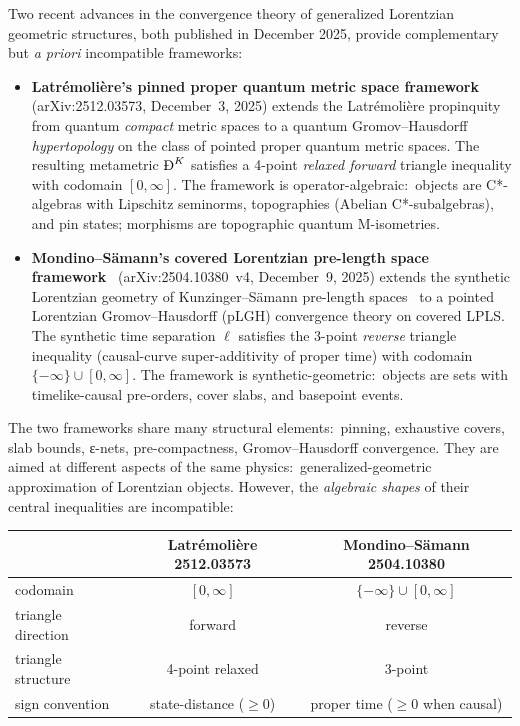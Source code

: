 \documentclass[11pt,a4paper]{article}
\theoremstyle{plain}
\theoremstyle{definition}
\newcommand{\BigDeth}{\text{\DJ}^{K}}
\begin{document}
Two recent advances in the convergence theory of generalized Lorentzian
geometric structures, both published in December 2025, provide
complementary but \emph{a priori} incompatible frameworks:

\begin{itemize}
\item \textbf{Latr\'emoli\`ere's pinned proper quantum metric space
framework}~\cite{latremoliere2025_hypertopology} (arXiv:2512.03573,
December~3, 2025) extends the Latr\'emoli\`ere
propinquity~\cite{latremoliere2018, latremoliere_metric_st_2017} from
quantum \emph{compact} metric spaces to a quantum Gromov--Hausdorff
\emph{hypertopology} on the class of pointed proper quantum metric
spaces. The resulting metametric $\BigDeth$ satisfies a 4-point
\emph{relaxed forward} triangle inequality with codomain $[0, \infty]$.
The framework is operator-algebraic:\ objects are C*-algebras with
Lipschitz seminorms, topographies (Abelian C*-subalgebras), and pin
states; morphisms are topographic quantum M-isometries.

\item \textbf{Mondino--S\"amann's covered Lorentzian pre-length space
framework}~\cite{mondino_samann2025_pointed} (arXiv:2504.10380~v4,
December~9, 2025) extends the synthetic Lorentzian geometry of
Kunzinger--S\"amann pre-length spaces~\cite{kunzinger_samann2018} to a
pointed Lorentzian Gromov--Hausdorff (pLGH) convergence theory on
covered LPLS. The synthetic time separation $\ell$ satisfies the
3-point \emph{reverse} triangle inequality (causal-curve
super-additivity of proper time) with codomain
$\{-\infty\}\cup[0,\infty]$. The framework is synthetic-geometric:\
objects are sets with timelike-causal pre-orders, cover slabs, and
basepoint events.
\end{itemize}

The two frameworks share many structural elements:\ pinning, exhaustive
covers, slab bounds, ε-nets, pre-compactness, Gromov--Hausdorff
convergence. They are aimed at different aspects of the same physics:\
generalized-geometric approximation of Lorentzian objects. However,
the \emph{algebraic shapes} of their central inequalities are
incompatible:

\begin{center}
\begin{tabular}{lcc}
\toprule
& Latr\'emoli\`ere 2512.03573 & Mondino--S\"amann 2504.10380 \\
\midrule
codomain         & $[0, \infty]$                 & $\{-\infty\}\cup [0, \infty]$ \\
triangle direction & forward                     & reverse \\
triangle structure & 4-point relaxed              & 3-point \\
sign convention    & state-distance ($\ge 0$)     & proper time ($\ge 0$ when causal) \\
\bottomrule
\end{tabular}
\end{center}
\end{document}
